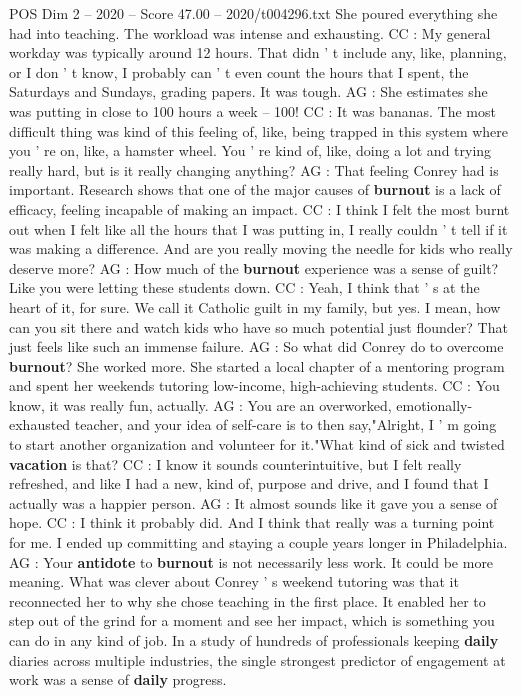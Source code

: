 \begin{textsample}{POS Dim 2 – 2020 – Score 47.00 – 2020/t004296.txt}
She poured everything she had into teaching.
The workload was intense and exhausting.
CC : My general workday was typically around 12 hours.
That didn ' t include any, like, planning, or I don ' t know, I probably can ' t even count the hours that I spent, the Saturdays and Sundays, grading papers.
It was tough.
AG : She estimates she was putting in close to 100 hours a week -- 100!
CC : It was bananas.
The most difficult thing was kind of this feeling of, like, being trapped in this system where you ' re on, like, a hamster wheel.
You ' re kind of, like, doing a lot and trying really hard, but is it really changing anything?
AG : That feeling Conrey had is important.
Research shows that one of the major causes of \textbf{burnout} is a lack of efficacy, feeling incapable of making an impact.
CC : I think I felt the most burnt out when I felt like all the hours that I was putting in, I really couldn ' t tell if it was making a difference.
And are you really moving the needle for kids who really deserve more?
AG : How much of the \textbf{burnout} experience was a sense of guilt?
Like you were letting these students down.
CC : Yeah, I think that ' s at the heart of it, for sure.
We call it Catholic guilt in my family, but yes.
I mean, how can you sit there and watch kids who have so much potential just flounder?
That just feels like such an immense failure.
AG : So what did Conrey do to overcome \textbf{burnout}?
She worked more.
She started a local chapter of a mentoring program and spent her weekends tutoring low-income, high-achieving students.
CC : You know, it was really fun, actually.
AG : You are an overworked, emotionally-exhausted teacher, and your idea of self-care is to then say,"Alright, I ' m going to start another organization and volunteer for it."What kind of sick and twisted \textbf{vacation} is that?
CC : I know it sounds counterintuitive, but I felt really refreshed, and like I had a new, kind of, purpose and drive, and I found that I actually was a happier person.
AG : It almost sounds like it gave you a sense of hope.
CC : I think it probably did.
And I think that really was a turning point for me.
I ended up committing and staying a couple years longer in Philadelphia.
AG : Your \textbf{antidote} to \textbf{burnout} is not necessarily less work.
It could be more meaning.
What was clever about Conrey ' s weekend tutoring was that it reconnected her to why she chose teaching in the first place.
It enabled her to step out of the grind for a moment and see her impact, which is something you can do in any kind of job.
In a study of hundreds of professionals keeping \textbf{daily} diaries across multiple industries, the single strongest predictor of engagement at work was a sense of \textbf{daily} progress.

\end{textsample}

